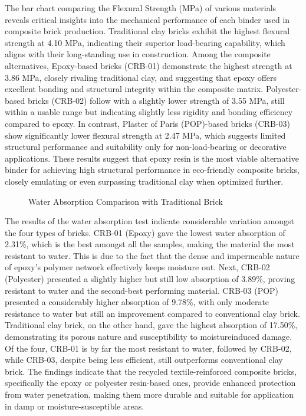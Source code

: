The bar chart comparing the Flexural Strength (MPa) of various materials reveals critical insights into the mechanical performance of each binder used in composite brick production. Traditional clay bricks exhibit the highest flexural strength at 4.10 MPa, indicating their superior load-bearing capability, which aligns with their long-standing use in construction. Among the composite alternatives, Epoxy-based bricks (CRB-01) demonstrate the highest strength at 3.86 MPa, closely rivaling traditional clay, and suggesting that epoxy offers excellent bonding and structural integrity within the composite matrix. Polyester-based bricks (CRB-02) follow with a slightly lower strength of 3.55 MPa, still within a usable range but indicating slightly less rigidity and bonding efficiency compared to epoxy. In contrast, Plaster of Paris (POP)-based bricks (CRB-03) show significantly lower flexural strength at 2.47 MPa, which suggests limited structural performance and suitability only for non-load-bearing or decorative applications. These results suggest that epoxy resin is the most viable alternative binder for achieving high structural performance in eco-friendly composite bricks, closely emulating or even surpassing traditional clay when optimized further.

\begin{figure}[H]
	\begin{minipage}{1\textwidth}
		\centering
		\caption{Water Absorption Comparison with Traditional Brick }
	\end{minipage}
\end{figure}

The results of the water absorption test indicate considerable variation amongst the four types of bricks. CRB-01 (Epoxy) gave the lowest water absorption of 2.31\%, which is the best amongst all the samples, making the material the most resistant to water. This is due to the fact that the dense and impermeable nature of epoxy's polymer network effectively keeps moisture out. Next, CRB-02 (Polyester) presented a slightly higher but still low absorption of 3.89\%, proving resistant to water and the second-best performing material. CRB-03 (POP) presented a considerably higher absorption of 9.78\%, with only moderate resistance to water but still an improvement compared to conventional clay brick. Traditional clay brick, on the other hand, gave the highest absorption of 17.50\%, demonstrating its porous nature and susceptibility to moistureinduced damage. Of the four, CRB-01 is by far the most resistant to water, followed by CRB-02, while CRB-03, despite being less efficient, still outperforms conventional clay brick. The findings indicate that the recycled textile-reinforced composite bricks, specifically the epoxy or polyester resin-based ones, provide enhanced protection from water penetration, making them more durable and suitable for application in damp or moisture-susceptible areas.